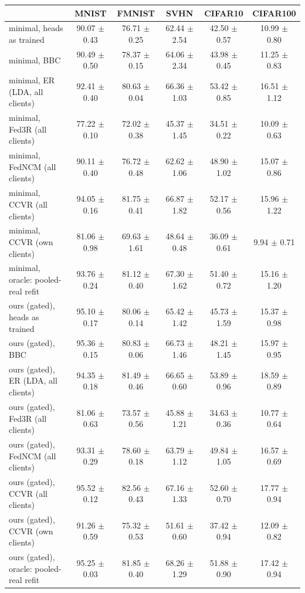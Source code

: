 \begin{tabular}{lccccc}
\toprule
 & MNIST & FMNIST & SVHN & CIFAR10 & CIFAR100 \\
\midrule
minimal, heads as trained & 90.07 $\pm$ 0.43 & 76.71 $\pm$ 0.25 & 62.44 $\pm$ 2.54 & 42.50 $\pm$ 0.57 & 10.99 $\pm$ 0.80 \\
minimal, BBC & 90.49 $\pm$ 0.50 & 78.37 $\pm$ 0.15 & 64.06 $\pm$ 2.34 & 43.98 $\pm$ 0.45 & 11.25 $\pm$ 0.83 \\
minimal, ER (LDA, all clients) & 92.41 $\pm$ 0.40 & 80.63 $\pm$ 0.04 & 66.36 $\pm$ 1.03 & 53.42 $\pm$ 0.85 & 16.51 $\pm$ 1.12 \\
minimal, Fed3R (all clients) & 77.22 $\pm$ 0.10 & 72.02 $\pm$ 0.38 & 45.37 $\pm$ 1.45 & 34.51 $\pm$ 0.22 & 10.09 $\pm$ 0.63 \\
minimal, FedNCM (all clients) & 90.11 $\pm$ 0.40 & 76.72 $\pm$ 0.48 & 62.62 $\pm$ 1.06 & 48.90 $\pm$ 1.02 & 15.07 $\pm$ 0.86 \\
minimal, CCVR (all clients) & 94.05 $\pm$ 0.16 & 81.75 $\pm$ 0.41 & 66.87 $\pm$ 1.82 & 52.17 $\pm$ 0.56 & 15.96 $\pm$ 1.22 \\
minimal, CCVR (own clients) & 81.06 $\pm$ 0.98 & 69.63 $\pm$ 1.61 & 48.64 $\pm$ 0.48 & 36.09 $\pm$ 0.61 & 9.94 $\pm$ 0.71 \\
minimal, oracle: pooled-real refit & 93.76 $\pm$ 0.24 & 81.12 $\pm$ 0.40 & 67.30 $\pm$ 1.62 & 51.40 $\pm$ 0.72 & 15.16 $\pm$ 1.20 \\
ours (gated), heads as trained & 95.10 $\pm$ 0.17 & 80.06 $\pm$ 0.14 & 65.42 $\pm$ 1.42 & 45.73 $\pm$ 1.59 & 15.37 $\pm$ 0.98 \\
ours (gated), BBC & 95.36 $\pm$ 0.15 & 80.83 $\pm$ 0.06 & 66.73 $\pm$ 1.46 & 48.21 $\pm$ 1.45 & 15.97 $\pm$ 0.95 \\
ours (gated), ER (LDA, all clients) & 94.35 $\pm$ 0.18 & 81.49 $\pm$ 0.46 & 66.65 $\pm$ 0.60 & 53.89 $\pm$ 0.96 & 18.59 $\pm$ 0.89 \\
ours (gated), Fed3R (all clients) & 81.06 $\pm$ 0.63 & 73.57 $\pm$ 0.56 & 45.88 $\pm$ 1.21 & 34.63 $\pm$ 0.36 & 10.77 $\pm$ 0.64 \\
ours (gated), FedNCM (all clients) & 93.31 $\pm$ 0.29 & 78.60 $\pm$ 0.18 & 63.79 $\pm$ 1.12 & 49.84 $\pm$ 1.05 & 16.57 $\pm$ 0.69 \\
ours (gated), CCVR (all clients) & 95.52 $\pm$ 0.12 & 82.56 $\pm$ 0.43 & 67.16 $\pm$ 1.33 & 52.60 $\pm$ 0.70 & 17.77 $\pm$ 0.94 \\
ours (gated), CCVR (own clients) & 91.26 $\pm$ 0.59 & 75.32 $\pm$ 0.53 & 51.61 $\pm$ 0.60 & 37.42 $\pm$ 0.94 & 12.09 $\pm$ 0.82 \\
ours (gated), oracle: pooled-real refit & 95.25 $\pm$ 0.03 & 81.85 $\pm$ 0.40 & 68.26 $\pm$ 1.29 & 51.88 $\pm$ 0.90 & 17.42 $\pm$ 0.94 \\
\bottomrule
\end{tabular}

